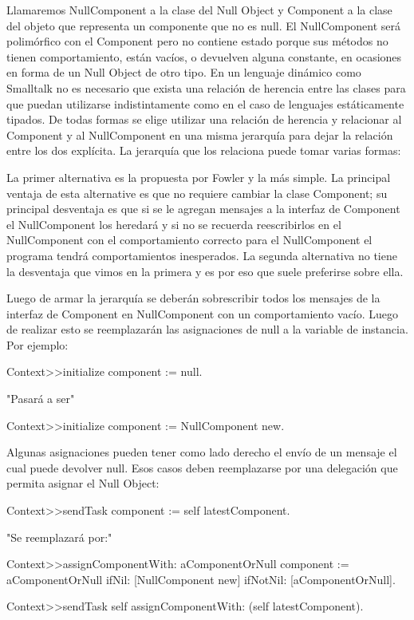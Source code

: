 Llamaremos NullComponent a la clase del Null Object y Component a la clase del objeto que representa
un componente que no es null. El NullComponent será polimórfico con el Component pero no contiene
estado porque sus métodos no tienen comportamiento, están vacíos, o devuelven alguna constante, en
ocasiones en forma de un Null Object de otro tipo. En un lenguaje dinámico como Smalltalk no es
necesario que exista una relación de herencia entre las clases para que puedan utilizarse
indistintamente como en el caso de lenguajes estáticamente tipados. De todas formas se elige
utilizar una relación de herencia y relacionar al Component y al NullComponent en una misma
jerarquía para dejar la relación entre los dos explícita. La jerarquía que los relaciona puede tomar
varias formas:


La primer alternativa es la propuesta por Fowler y la más simple. La principal ventaja de esta
alternative es que no requiere cambiar la clase Component; su principal desventaja es que si se le
agregan mensajes a la interfaz de Component el NullComponent los heredará y si no se recuerda
reescribirlos en el NullComponent con el comportamiento correcto para el NullComponent el programa
tendrá comportamientos inesperados. La segunda alternativa no tiene la desventaja que vimos en la
primera y es por eso que suele preferirse sobre ella.

Luego de armar la jerarquía se deberán sobrescribir todos los mensajes de la interfaz de Component
en NullComponent con un comportamiento vacío. Luego de realizar esto se reemplazarán las asignaciones de
null a la variable de instancia. Por ejemplo:

\begin{code}
Context>>initialize
    component := null.

"Pasará a ser"

Context>>initialize
    component := NullComponent new.
\end{code}

Algunas asignaciones pueden tener como lado derecho el envío de un mensaje el cual puede devolver 
null. Esos casos deben reemplazarse por una delegación que permita asignar el Null Object:

\begin{code}
Context>>sendTask
    component := self latestComponent.

"Se reemplazará por:"

Context>>assignComponentWith: aComponentOrNull
    component := aComponentOrNull ifNil: [NullComponent new] ifNotNil: [aComponentOrNull].

Context>>sendTask
    self assignComponentWith: (self latestComponent).
\end{code}

